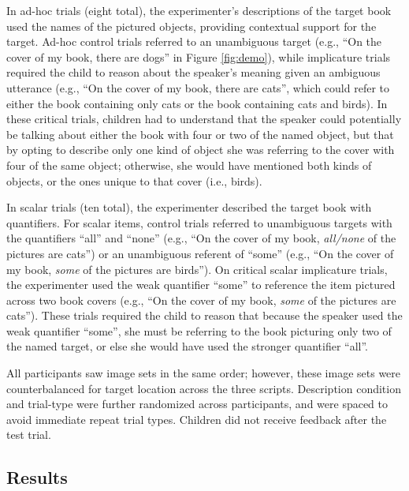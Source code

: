\documentclass[man]{apa2}
\begin{document}
In ad-hoc trials (eight total), the experimenter's descriptions of the target book used the names of the pictured objects, providing contextual support for the target. Ad-hoc control trials referred to an unambiguous target (e.g., ``On the cover of my book, there are dogs'' in Figure \ref{fig:demo}), while implicature trials required the child to reason about the speaker's meaning given an ambiguous utterance (e.g., ``On the cover of my book, there are cats'', which could refer to either the book containing only cats or the book containing cats and birds). In these critical trials, children had to understand that the speaker could potentially be talking about either the book with four or two of the named object, but that by opting to describe only one kind of object she was referring to the cover with four of the same object; otherwise, she would have mentioned both kinds of objects, or the ones unique to that cover (i.e., birds). 

In scalar trials (ten total), the experimenter described the target book with quantifiers. For scalar items, control trials referred to unambiguous targets with the quantifiers ``all'' and ``none'' (e.g., ``On the cover of my book, \textit{all/none} of the pictures are cats'') or an unambiguous referent of ``some'' (e.g., ``On the cover of my book, \textit{some} of the pictures are birds''). On critical scalar implicature trials, the experimenter used the weak quantifier ``some'' to reference the item pictured across two book covers (e.g., ``On the cover of my book, \textit{some} of the pictures are cats''). These trials required the child to reason that because the speaker used the weak quantifier ``some'', she must be referring to the book picturing only two of the named target, or else she would have used the stronger quantifier ``all''. 

All participants saw image sets in the same order; however, these image sets were counterbalanced for target location across the three scripts. Description condition and trial-type were further randomized across participants, and were spaced to avoid immediate repeat trial types. Children did not receive feedback after the test trial.

\subsection{Results}
\end{document}
